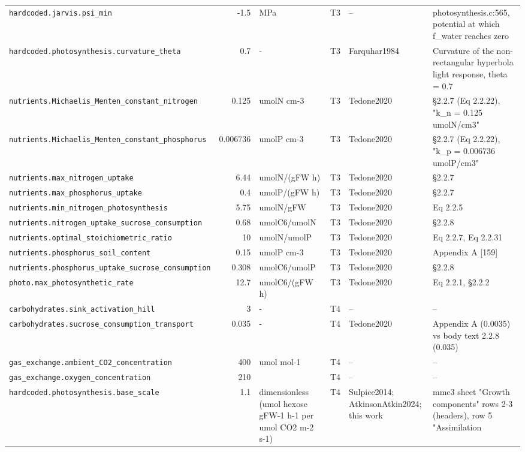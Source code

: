 \documentclass[a4paper,11pt]{article}
\begin{document}
\begin{table}[!htbp]
\begin{tabular}{@{}p{52mm}rp{20mm}cp{20mm}p{38mm}@{}}
\texttt{hardcoded.jarvis.psi\_min} & -1.5 & MPa & T3 & -- & photosynthesis.c:565, potential at which f\_water reaches zero \\
\texttt{hardcoded.photosynthesis.curvature\_theta} & 0.7 & - & T3 & Farquhar1984 & Curvature of the non-rectangular hyperbola light response, theta = 0.7 \\
\texttt{nutrients.Michaelis\_Menten\_constant\_nitrogen} & 0.125 & umolN cm-3 & T3 & Tedone2020 & §2.2.7 (Eq 2.2.22), "k\_n = 0.125 umolN/cm3" \\
\texttt{nutrients.Michaelis\_Menten\_constant\_phosphorus} & 0.006736 & umolP cm-3 & T3 & Tedone2020 & §2.2.7 (Eq 2.2.22), "k\_p = 0.006736 umolP/cm3" \\
\texttt{nutrients.max\_nitrogen\_uptake} & 6.44 & umolN/(gFW h) & T3 & Tedone2020 & §2.2.7 \\
\texttt{nutrients.max\_phosphorus\_uptake} & 0.4 & umolP/(gFW h) & T3 & Tedone2020 & §2.2.7 \\
\texttt{nutrients.min\_nitrogen\_photosynthesis} & 5.75 & umolN/gFW & T3 & Tedone2020 & Eq 2.2.5 \\
\texttt{nutrients.nitrogen\_uptake\_sucrose\_consumption} & 0.68 & umolC6/umolN & T3 & Tedone2020 & §2.2.8 \\
\texttt{nutrients.optimal\_stoichiometric\_ratio} & 10 & umolN/umolP & T3 & Tedone2020 & Eq 2.2.7, Eq 2.2.31 \\
\texttt{nutrients.phosphorus\_soil\_content} & 0.15 & umolP cm-3 & T3 & Tedone2020 & Appendix A [159] \\
\texttt{nutrients.phosphorus\_uptake\_sucrose\_consumption} & 0.308 & umolC6/umolP & T3 & Tedone2020 & §2.2.8 \\
\texttt{photo.max\_photosynthetic\_rate} & 12.7 & umolC6/(gFW h) & T3 & Tedone2020 & Eq 2.2.1, §2.2.2 \\
\texttt{carbohydrates.sink\_activation\_hill} & 3 & - & T4 & -- & -- \\
\texttt{carbohydrates.sucrose\_consumption\_transport} & 0.035 & - & T4 & Tedone2020 & Appendix A (0.0035) vs body text 2.2.8 (0.035) \\
\texttt{gas\_exchange.ambient\_CO2\_concentration} & 400 & umol mol-1 & T4 & -- & -- \\
\texttt{gas\_exchange.oxygen\_concentration} & 210 &  & T4 & -- & -- \\
\texttt{hardcoded.photosynthesis.base\_scale} & 1.1 & dimensionless (umol hexose gFW-1 h-1 per umol CO2 m-2 s-1) & T4 & Sulpice2014; AtkinsonAtkin2024; this work & mmc3 sheet "Growth components" rows 2-3 (headers), row 5 "Assimilation \\

\end{tabular}
\end{table}
\end{document}
